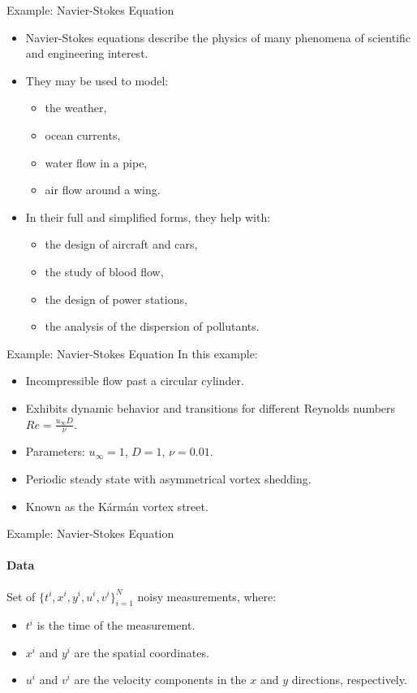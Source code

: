 \begin{frame}{Example: Navier-Stokes Equation}
    \begin{itemize}
        \item Navier-Stokes equations describe the physics of many phenomena of scientific and engineering interest.
        \item They may be used to model:
        \begin{itemize}
            \item the weather,
            \item ocean currents,
            \item water flow in a pipe,
            \item air flow around a wing.
        \end{itemize}
        \item In their full and simplified forms, they help with:
        \begin{itemize}
            \item the design of aircraft and cars,
            \item the study of blood flow,
            \item the design of power stations,
            \item the analysis of the dispersion of pollutants.
        \end{itemize}
    \end{itemize}
    \end{frame}
    
    \begin{frame}{Example: Navier-Stokes Equation}
    In this example:
    \begin{itemize}
        \item Incompressible flow past a circular cylinder.
        \item Exhibits dynamic behavior and transitions for different Reynolds numbers \( Re = \frac{u_\infty D}{\nu} \).
        \item Parameters: \( u_\infty = 1 \), \( D = 1 \), \( \nu = 0.01 \).
        \item Periodic steady state with asymmetrical vortex shedding.
        \item Known as the Kármán vortex street.
    \end{itemize}
    \end{frame}
    
    \begin{frame}{Example: Navier-Stokes Equation}
    \framesubtitle{Data}
    Set of $\{t^i, x^i, y^i, u^i, v^i\}_{i=1}^N$ noisy measurements, where:
    \begin{itemize}
        \item \( t^i \) is the time of the measurement.
        \item \( x^i \) and \( y^i \) are the spatial coordinates.
        \item \( u^i \) and \( v^i \) are the velocity components in the \( x \) and \( y \) directions, respectively.
    \end{itemize}
    \end{frame}
    
